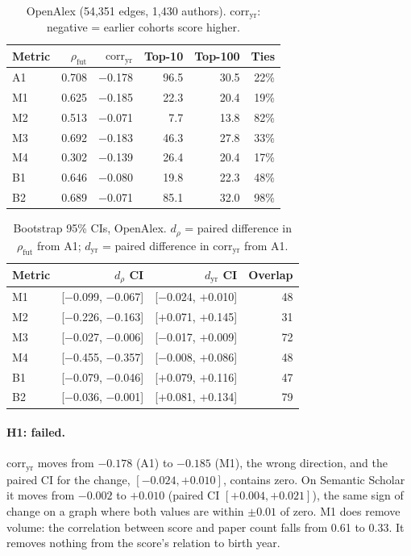 \documentclass{article}
\begin{document}
\begin{table}[h]
\caption{OpenAlex (54,351 edges, 1,430 authors). $\text{corr}_{\text{yr}}$: negative = earlier
  cohorts score higher.}
\label{tab:oa}
\centering
\footnotesize
\setlength{\tabcolsep}{3.5pt}
\begin{tabular}{lrrrrr}
\toprule
\textbf{Metric} & $\rho_{\text{fut}}$ & $\text{corr}_{\text{yr}}$ & \textbf{Top-10} & \textbf{Top-100} & \textbf{Ties} \\
\midrule
A1 & 0.708 & $-$0.178 & 96.5 & 30.5 & 22\% \\
M1 & 0.625 & $-$0.185 & 22.3 & 20.4 & 19\% \\
M2 & 0.513 & $-$0.071 & 7.7  & 13.8 & 82\% \\
M3 & 0.692 & $-$0.183 & 46.3 & 27.8 & 33\% \\
M4 & 0.302 & $-$0.139 & 26.4 & 20.4 & 17\% \\
B1 & 0.646 & $-$0.080 & 19.8 & 22.3 & 48\% \\
B2 & 0.689 & $-$0.071 & 85.1 & 32.0 & 98\% \\
\bottomrule
\end{tabular}
\end{table}

\begin{table}[h]
\caption{Bootstrap 95\% CIs, OpenAlex. $d_\rho$ = paired difference in $\rho_{\text{fut}}$ from
  A1; $d_{\text{yr}}$ = paired difference in $\text{corr}_{\text{yr}}$ from A1.}
\label{tab:ci}
\centering
\footnotesize
\setlength{\tabcolsep}{3pt}
\begin{tabular}{lrrr}
\toprule
\textbf{Metric} & $d_\rho$ \textbf{CI} & $d_{\text{yr}}$ \textbf{CI} & \textbf{Overlap} \\
\midrule
M1 & [$-$0.099, $-$0.067] & [$-$0.024, $+$0.010] & 48 \\
M2 & [$-$0.226, $-$0.163] & [$+$0.071, $+$0.145] & 31 \\
M3 & [$-$0.027, $-$0.006] & [$-$0.017, $+$0.009] & 72 \\
M4 & [$-$0.455, $-$0.357] & [$-$0.008, $+$0.086] & 48 \\
B1 & [$-$0.079, $-$0.046] & [$+$0.079, $+$0.116] & 47 \\
B2 & [$-$0.036, $-$0.001] & [$+$0.081, $+$0.134] & 79 \\
\bottomrule
\end{tabular}
\end{table}

\paragraph{H1: failed.} $\text{corr}_{\text{yr}}$ moves from $-0.178$ (A1) to $-0.185$ (M1), the
wrong direction, and the paired CI for the change, $[-0.024, +0.010]$, contains zero. On Semantic
Scholar it moves from $-0.002$ to $+0.010$ (paired CI $[+0.004, +0.021]$), the same sign of change
on a graph where both values are within $\pm 0.01$ of zero. M1
does remove volume: the correlation between score and paper count falls from 0.61 to 0.33. It
removes nothing from the score's relation to birth year.
\end{document}

